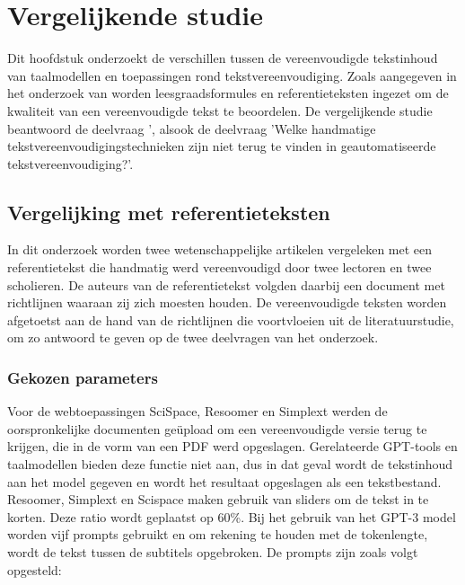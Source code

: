 \section{Vergelijkende studie}

Dit hoofdstuk onderzoekt de verschillen tussen de vereenvoudigde tekstinhoud van taalmodellen en toepassingen rond tekstvereenvoudiging. Zoals aangegeven in het onderzoek van \textcite{Nenkova2004} worden leesgraadsformules en referentieteksten ingezet om de kwaliteit van een vereenvoudigde tekst te beoordelen. De vergelijkende studie beantwoord de deelvraag ', alsook de deelvraag 'Welke handmatige tekstvereenvoudigingstechnieken zijn niet terug te vinden in geautomatiseerde tekstvereenvoudiging?'.

\subsection{Vergelijking met referentieteksten}

In dit onderzoek worden twee wetenschappelijke artikelen vergeleken met een referentietekst die handmatig werd vereenvoudigd door twee lectoren en twee scholieren. De auteurs van de referentietekst volgden daarbij een document met richtlijnen waaraan zij zich moesten houden. De vereenvoudigde teksten worden afgetoetst aan de hand van de richtlijnen die voortvloeien uit de literatuurstudie, om zo antwoord te geven op de twee deelvragen van het onderzoek. 

\subsubsection{Gekozen parameters}
Voor de webtoepassingen SciSpace, Resoomer en Simplext werden de oorspronkelijke documenten geüpload om een vereenvoudigde versie terug te krijgen, die in de vorm van een PDF werd opgeslagen. Gerelateerde GPT-tools en taalmodellen bieden deze functie niet aan, dus in dat geval wordt de tekstinhoud aan het model gegeven en wordt het resultaat opgeslagen als een tekstbestand. Resoomer, Simplext en Scispace maken gebruik van sliders om de tekst in te korten. Deze ratio wordt geplaatst op 60\%. Bij het gebruik van het GPT-3 model worden vijf prompts gebruikt en om rekening te houden met de tokenlengte, wordt de tekst tussen de subtitels opgebroken. De prompts zijn zoals volgt opgesteld:

